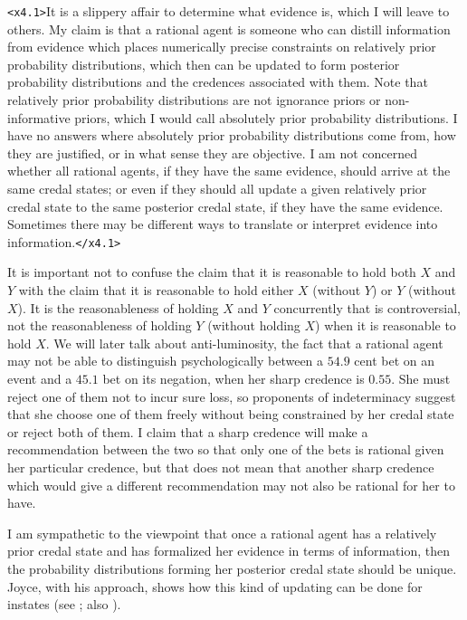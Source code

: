 \documentclass[11pt]{article}
\begin{document}
\texttt{<x4.1>}It is a slippery affair to determine what evidence is, which I will leave to others. My claim is that a rational agent is someone who can distill information from evidence which places numerically precise constraints on relatively prior probability distributions, which then can be updated to form posterior probability distributions and the credences associated with them. Note that relatively prior probability distributions are not ignorance priors or non-informative priors, which I would call absolutely prior probability distributions. I have no answers where absolutely prior probability distributions come from, how they are justified, or in what sense they are objective. I am not concerned whether all rational agents, if they have the same evidence, should arrive at the same credal states; or even if they should all update a given relatively prior credal state to the same posterior credal state, if they have the same evidence. Sometimes there may be different ways to translate or interpret evidence into information.\texttt{</x4.1>}

It is important not to confuse the claim that it is reasonable to hold both $X$ and $Y$ with the claim that it is reasonable to hold either $X$ (without $Y$) or $Y$ (without $X$). It is the reasonableness of holding $X$ and $Y$ concurrently that is controversial, not the reasonableness of holding $Y$ (without holding $X$) when it is reasonable to hold $X$. We will later talk about anti-luminosity, the fact that a rational agent may not be able to distinguish psychologically between a $54.9$ cent bet on an event and a $45.1$ bet on its negation, when her sharp credence is $0.55$. She must reject one of them not to incur sure loss, so proponents of indeterminacy suggest that she choose one of them freely without being constrained by her credal state or reject both of them. I claim that a sharp credence will make a recommendation between the two so that only one of the bets is rational given her particular credence, but that does not mean that another sharp credence which would give a different recommendation may not also be rational for her to have.

I am sympathetic to the viewpoint that once a rational agent has a relatively prior credal state and has formalized her evidence in terms of information, then the probability distributions forming her posterior credal state should be unique. Joyce, with his  approach, shows how this kind of updating can be done for instates (see ; also ).
\end{document}
